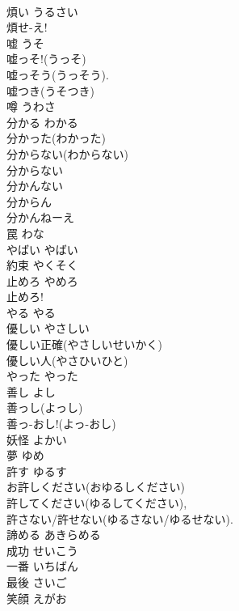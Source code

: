 \documentclass[8pt]{extreport}
\begin{document}
\begin{CJK}{UTF8}{min}
\\	煩い	うるさい	
\\	煩せ-え! 
\\	嘘	うそ	
\\	嘘っそ!(うっそ) 
\\	嘘っそう(うっそう). 
\\	嘘つき(うそつき) 
\\	噂	うわさ	
\\	分かる	わかる	
\\	分かった(わかった) 
\\	分からない(わからない) 
\\	分からない 
\\	分かんない
\\	分からん
\\	分かんねーえ	
\\	罠	わな	
\\	やばい	やばい	
\\	約束	やくそく	
\\	止めろ	やめろ	
\\	止めろ! 
\\	やる	やる	
\\	優しい	やさしい	
\\	優しい正確(やさしいせいかく) 
\\	優しい人(やさひいひと) 
\\	やった	やった	
\\	善し	よし	
\\	善っし(よっし) 
\\	善っ-おし!(よっ-おし)	
\\	妖怪	よかい	
\\	夢	ゆめ	
\\	許す	ゆるす	
\\	お許しください(おゆるしください) 
\\	許してください(ゆるしてください), 
\\	許さない/許せない(ゆるさない/ゆるせない). 
\\	諦める	あきらめる	
\\	成功	せいこう	
\\	一番	いちばん	
\\	最後	さいご	
\\	笑顔	えがお	
\end{CJK}
\end{document}
